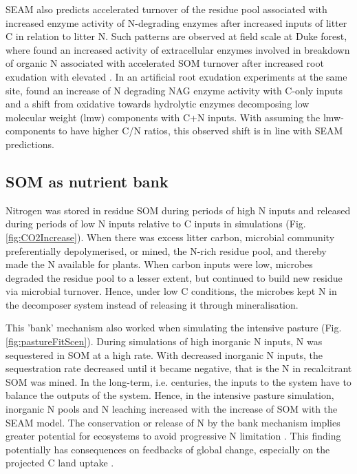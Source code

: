 SEAM also predicts accelerated turnover of the residue pool associated with
increased enzyme activity of N-degrading enzymes after increased inputs of
litter C in relation to litter N.
Such patterns are observed at field scale at Duke forest, where
\citet{Phillips11} found an increased activity of extracellular enzymes involved
in breakdown of organic N associated with accelerated SOM turnover after
increased root exudation with elevated . In an artificial
root exudation experiments at the same site, \citet{Drake13} found an increase of N
degrading NAG enzyme activity with C-only inputs and a shift from oxidative
towards hydrolytic enzymes decomposing low molecular weight (lmw) components
with C+N inputs.
With assuming the lmw-components to have higher C/N ratios, this observed shift
is in line with SEAM predictions.

\subsection{SOM as nutrient bank}
Nitrogen was stored in residue SOM during periods of high N inputs and released
during periods of low N inputs relative to C inputs in simulations (Fig.
\ref{fig:CO2Increase}). When there was excess litter carbon, microbial community
preferentially depolymerised, or mined, the N-rich residue pool, and thereby
made the N available for plants. When carbon inputs were low, microbes degraded
the residue pool to a lesser extent, but continued to build new residue via
microbial turnover. Hence, under low C conditions, the microbes kept N in the
decomposer system instead of releasing it through mineralisation.

This 'bank' mechanism \citep[sensu][]{Perveen14} also worked when simulating the
intensive pasture (Fig. \ref{fig:pastureFitScen}). During simulations of high
inorganic N inputs, N was sequestered in SOM at a high rate. With decreased
inorganic N inputs, the sequestration rate decreased until it became negative,
that is the N in recalcitrant SOM was mined. In the long-term, i.e. centuries,
the inputs to the system have to balance the outputs of the system. Hence, in
the intensive pasture simulation, inorganic N pools and N leaching increased with
the increase of SOM with the SEAM model. The conservation or release of N by the
bank mechanism implies greater potential for ecosystems to avoid progressive N
limitation \citep{Norby10, Franklin14, Averill15}. This finding
potentially has consequences on feedbacks of global change, especially on the
projected C land uptake \citep{Friedlingstein14}.

